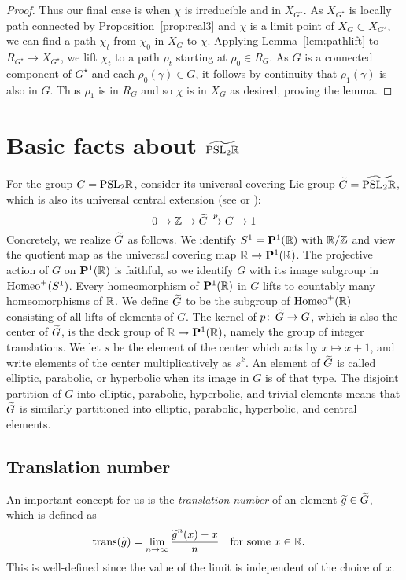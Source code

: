 \documentclass[tikz, sepfignums, defaultenums]{nmd/article}
\newcommand{\G}{G}
\newcommand{\GG}{{G^\star}}
\newcommand{\projsp}{\P}
\DeclareMathOperator{\trans}{trans}
\begin{document}
\begin{proof}
Thus our final case is when $\chi$ is irreducible and in $X_\GG$.  As
$X_\GG$ is locally path connected by Proposition~\ref{prop:real3} and
$\chi$ is a limit point of $X_\G \subset X_\GG$, we can find a path
$\chi_t$ from $\chi_0$ in $X_G$ to $\chi$.  Applying
Lemma~\ref{lem:pathlift} to $R_\GG \to X_\GG$, we lift
$\chi_t$ to a path $\rho_t$ starting at $\rho_0 \in R_G$.  As $G$ is a
connected component of $\GG$ and each $\rho_0(\gamma) \in G$, it
follows by continuity that $\rho_1(\gamma)$ is also in $G$.  Thus
$\rho_1$ is in $R_G$ and so $\chi$ is in $X_G$ as desired, proving the
lemma.
\end{proof}


\section{Basic facts about $\widetilde{\mathrm{PSL}_{2} {\mathbb R}}$}
\label{sec:basicfacts}

For the group $\G = \PSL{2}{\R}$, consider its universal covering Lie group
$\Gtil = \PSLRtilde$, which is also its universal central extension
(see \cite[\S 5]{Ghys2001} or \cite[\S 2.3.3]{Calegari2009}):
\[
0 \to \Z \to \Gtil \xrightarrow{p} \G \to 1
\]
Concretely, we realize $\Gtil$ as follows. We identify
$S^1 = \projsp^1(\R)$ with ${\mathbb R}/{\mathbb Z}$ and view the quotient map as the
universal covering map $\R \to \projsp^1(\R)$.  The projective action
of $\G$ on $\projsp^1(\R)$ is faithful, so we identify $\G$ with its
image subgroup in $\operatorname{Homeo}^+(S^1)$.   Every
homeomorphism of $\projsp^1(\R)$ in $G$ lifts to countably many
homeomorphisms of ${\mathbb R}$. We define $\Gtil$ to be the subgroup of
$\operatorname{Homeo}^+({\mathbb R})$ consisting of all lifts of elements of $\G$.
The kernel of $p \maps \Gtil \to \G$, which is also the center of
$\Gtil$, is the deck group of $\R \to \projsp^1(\R)$, namely the group
of integer translations. We let $s$ be the element of the center which
acts by $x \mapsto x + 1$, and write elements of the center
multiplicatively as $s^k$.  An element of $\Gtil$ is called elliptic,
parabolic, or hyperbolic when its image in $\G$ is of that type.  The
disjoint partition of $\G$ into elliptic, parabolic, hyperbolic, and
trivial elements means that $\Gtil$ is similarly partitioned into
elliptic, parabolic, hyperbolic, and central elements.

\subsection{Translation number}
\label{sec:transnum}

An important concept for us is the \emph{translation number} of an
element $\gtil \in \Gtil$, which is defined as
\begin{equation}
\label{eq:transdef}
\trans(\gtil) = \lim_{n \to \infty} \frac{\gtil^n(x) - x}{n}
\mtext{for some $x \in \R$.}
\end{equation}
This is well-defined since the value of the limit is independent
of the choice of $x$.
\end{document}
